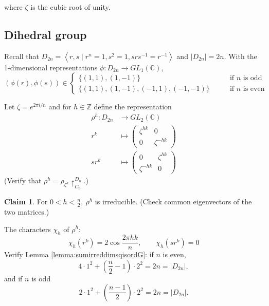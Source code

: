 \documentclass{article}
\newcommand{\la}{\left\langle}
\newcommand{\ra}{\right\rangle}
\newcommand{\Z}{\mathbb{Z}}
\newcommand{\C}{\mathbb{C}}
\theoremstyle{definition}
\newtheorem{claim}[defn]{Claim}
\begin{document}
where $\zeta$ is the cubic root of unity.

\subsection{Dihedral group}
Recall that $D_{2n}=\la r,s\mid r^n=1,s^2=1,srs^{-1}=r^{-1}\ra$ and $|D_{2n}|=2n$. With the 1-dimensional representations $\phi:D_{2n}\rightarrow GL_1(\C)$,
\[
(\phi(r),\phi(s))\in\left\{\begin{aligned}
\{(1,1),(1,-1)\} &\qquad\text{if }n\text{ is odd}\\
\{(1,1),(1,-1),(-1,1),(-1,-1)\} &\qquad\text{if }n\text{ is even}
\end{aligned} \right.
\]

Let $\zeta=e^{2\pi i/n}$ and for $h\in\Z$ define the representation
\[
\begin{aligned}
\rho^h:D_{2n}&\rightarrow GL_2(\C)\\
r^k&\mapsto\begin{pmatrix}
\zeta^{hk}&0\\0&\zeta^{-hk}
\end{pmatrix}\\
sr^k&\mapsto\begin{pmatrix}
0 & \zeta^{hk}\\\zeta^{-hk}&0
\end{pmatrix}
\end{aligned}
\]
(Verify that $\rho^h=\rho_{\zeta^h}\uparrow_{C_n}^{D_n}$.)
\begin{claim}
For $0<h<\frac{n}{2},\ \rho^h$ is irreducible. (Check common eigenvectors of the two matrices.)
\end{claim}
The characters $\chi_h$ of $\rho^h$:
\[
\chi_h(r^k)=2\cos\frac{2\pi hk}{n},\qquad \chi_h(sr^k)=0
\]
Verify Lemma \ref{lemma:sumirreddimsqisordG}: if $n$ is even, 
\[
4\cdot 1^2+\left(\frac{n}{2}-1\right)\cdot 2^2=2n=|D_{2n}|,
\]
and if $n$ is odd
\[
2\cdot 1^2+\left(\frac{n-1}{2}\right)\cdot 2^2=2n=|D_{2n}|.
\]
\end{document}
